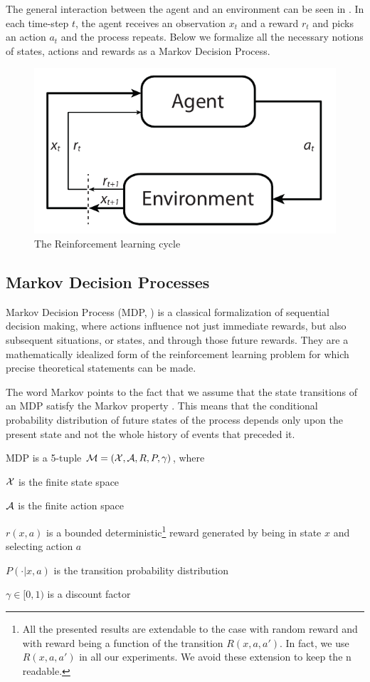 The general interaction between the agent and an environment can be seen in . In each time-step $t$, the agent receives an observation $x_t$ and a reward $r_t$ and picks an action $a_t$ and the process repeats. Below we formalize all the necessary notions of states, actions and rewards as a Markov Decision Process.

\begin{figure}[h]
\center
\includegraphics[width=.6\linewidth]{gfx/rl_loop.pdf}
\caption{The Reinforcement learning cycle}
\label{fig:rlloop}
\end{figure}

\subsection{Markov Decision Processes}

Markov Decision Process (MDP, \citet{bellman1957markovian}) is a classical formalization of sequential decision making, where actions influence not just immediate rewards, but also subsequent situations, or states, and through those future rewards. They are a mathematically idealized form of the reinforcement learning problem for which precise theoretical statements can be made.

The word Markov points to the fact that we assume that the state transitions of an MDP satisfy the Markov property \cite{???}. This means that the conditional probability distribution of future states of the process depends only upon the present state and not the whole history of events that preceded it.

\begin{definition}

MDP is a 5-tuple $\mathcal{M} = (\mathcal{X}, \mathcal{A}, R, P, \gamma)$, where 

$\mathcal{X}$ is the finite state space

$\mathcal{A}$ is the finite action space

$r(x, a)$ is a bounded deterministic\footnote{All the presented results are extendable to the case with random reward and with reward being a function of the transition $R(x, a, a')$. In fact, we use $R(x, a, a')$ in all our experiments. We avoid these extension to keep the n readable.} reward generated by being in state $x$ and selecting action $a$

$P(\cdot|x, a)$ is the transition probability distribution

$\gamma \in [0, 1)$ is a discount factor
\end{definition}

